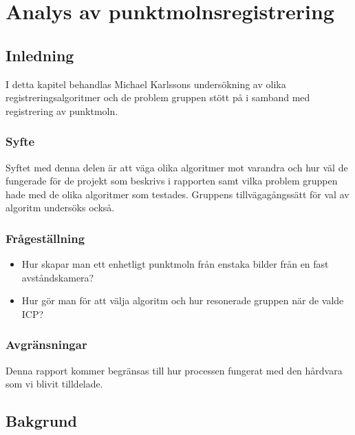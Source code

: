 \chapter{Analys av punktmolnsregistrering}
\label{cha:indiv-report-karlsson}


\section{Inledning}
\label{sec:introduction-karlsson}

I detta kapitel behandlas Michael Karlssons undersökning av olika registreringsalgoritmer och de problem gruppen stött på i samband med registrering av punktmoln.

\subsection{Syfte}
\label{sec:purpose-karlsson}

Syftet med denna delen är att väga olika algoritmer mot varandra och hur väl de fungerade för de projekt som beskrivs i rapporten samt vilka problem gruppen hade med de olika algoritmer som testades. Gruppens tillvägagångssätt för val av algoritm undersöks också.


\subsection{Frågeställning}
\label{sec:issue-karlsson}

\begin{itemize}
	\item Hur skapar man ett enhetligt punktmoln från enstaka bilder från en fast \newline avståndskamera?
	\item Hur gör man för att välja algoritm och hur resonerade gruppen när de valde ICP?	
\end{itemize}
\subsection{Avgränsningar}

Denna rapport kommer begränsas till hur processen fungerat med den hårdvara som vi blivit tilldelade.


\section{Bakgrund}
\label{sec:background-karlsson}



